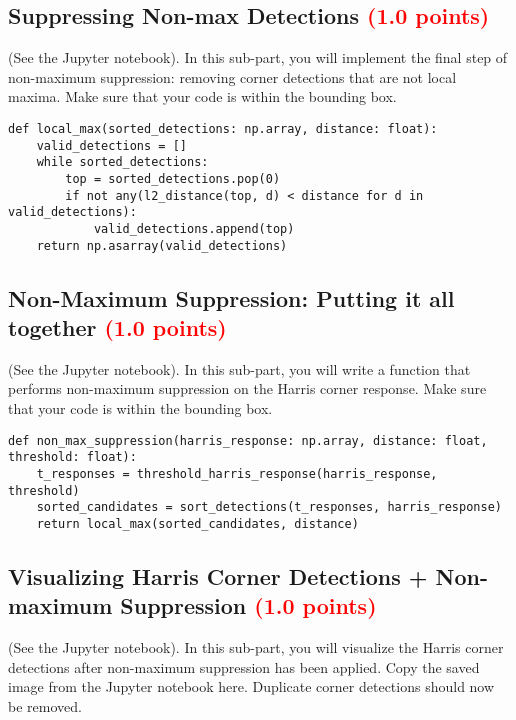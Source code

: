 \documentclass[answers]{exam}
\newcommand{\mypoints}[1]{\textcolor{red}{(#1 points)}}
\begin{document}
\subsection{Suppressing Non-max Detections \mypoints{1.0}}
(See the Jupyter notebook). In this sub-part, you will implement the final step of non-maximum suppression: removing corner detections that are not local maxima. Make sure that your code is within the bounding box.

\begin{solution}
\begin{verbatim}
def local_max(sorted_detections: np.array, distance: float):
    valid_detections = []
    while sorted_detections:
        top = sorted_detections.pop(0)
        if not any(l2_distance(top, d) < distance for d in valid_detections):
            valid_detections.append(top)
    return np.asarray(valid_detections)
\end{verbatim}
\end{solution}

\subsection{Non-Maximum Suppression: Putting it all together \mypoints{1.0}}
(See the Jupyter notebook). In this sub-part, you will write a function that performs non-maximum suppression on the Harris corner response. Make sure that your code is within the bounding box.

\begin{solution}
\begin{verbatim}
def non_max_suppression(harris_response: np.array, distance: float, threshold: float):
    t_responses = threshold_harris_response(harris_response, threshold)
    sorted_candidates = sort_detections(t_responses, harris_response)
    return local_max(sorted_candidates, distance)
\end{verbatim}
\end{solution}


\subsection{Visualizing Harris Corner Detections + Non-maximum Suppression \mypoints{1.0}}
(See the Jupyter notebook). In this sub-part, you will visualize the Harris corner detections after non-maximum suppression has been applied. Copy the saved image from the Jupyter notebook here. Duplicate corner detections should now be removed.
\end{document}
